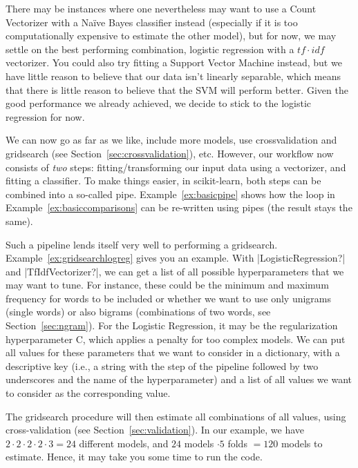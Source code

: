 There may be instances where one nevertheless may want to use a Count
Vectorizer with a Na\"ive Bayes classifier instead (especially if it
is too computationally expensive to estimate the other model), but for
now, we may settle on the best performing combination, logistic
regression with a $tf\cdot idf$ vectorizer. You could also try fitting
a Support Vector Machine instead, but we have little reason to believe
that our data isn't linearly separable, which means that there is
little reason to believe that the SVM will perform better. Given the
good performance we already achieved, we decide to stick to the
logistic regression for now.


We can now go as far as we like, include more models, use
crossvalidation and gridsearch (see
Section~\ref{sec:crossvalidation}), etc. However, our workflow now
consists of \emph{two} steps: fitting/transforming our input data
using a vectorizer, and fitting a classifier. To make things easier,
in scikit-learn, both steps can be combined into a so-called
pipe. Example~\ref{ex:basicpipe} shows how the loop in
Example~\ref{ex:basiccomparisons} can be re-written using pipes (the
result stays the same).


Such a pipeline lends itself very well to performing a
gridsearch. Example~\ref{ex:gridsearchlogreg} gives you an example.  With
|LogisticRegression?| and |TfIdfVectorizer?|, we can get a list of all
possible hyperparameters that we may want to tune. For instance, these
could be the minimum and maximum frequency for words to be included or
whether we want to use only unigrams (single words) or also bigrams
(combinations of two words, see Section~\ref{sec:ngram}).
For the Logistic Regression, it may be the
regularization hyperparameter C, which applies a penalty for too
complex models.  We can  put all values for these parameters
that we want to consider in a dictionary, with a descriptive key (i.e., a string with the step of the pipeline followed by two underscores and the name of the hyperparameter) and a list of all values we want to consider as the corresponding value.

The gridsearch procedure will then estimate all combinations of all
values, using cross-validation (see Section~\ref{sec:validation}). In
our example, we have $2 \cdot 2 \cdot 2 \cdot 2 \cdot 3 = 24$
different models, and $24$ models $\cdot 5$ folds $= 120$ models to
estimate. Hence, it may take you some time to run the code.

